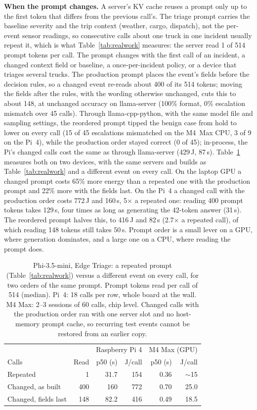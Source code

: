 \documentclass[conference]{IEEEtran}
\begin{document}
\textbf{When the prompt changes.}\label{sec:stream} A server's KV cache reuses a prompt only up to the first token that differs from the previous call's. The triage prompt carries the baseline severity and the trip context (weather, cargo, dispatch), not the per-event sensor readings, so consecutive calls about one truck in one incident usually repeat it, which is what Table~\ref{tab:realwork} measures: the server read 1 of 514 prompt tokens per call. The prompt changes with the first call of an incident, a changed context field or baseline, a once-per-incident policy, or a device that triages several trucks. The production prompt places the event's fields before the decision rules, so a changed event re-reads about 400 of its 514 tokens; moving the fields after the rules, with the wording otherwise unchanged, cuts this to about 148, at unchanged accuracy on llama-server (100\% format, 0\% escalation mismatch over 45 calls). Through llama-cpp-python, with the same model file and sampling settings, the reordered prompt tipped the benign case from hold to lower on every call (15 of 45 escalations mismatched on the M4~Max CPU, 3 of 9 on the Pi~4), while the production order stayed correct (0 of 45); in-process, the Pi's changed calls cost the same as through llama-server (429\,J, 87\,s). Table~\ref{tab:stream} measures both on two devices, with the same servers and builds as Table~\ref{tab:realwork} and a different event on every call. On the laptop GPU a changed prompt costs 65\% more energy than a repeated one with the production prompt and 22\% more with the fields last. On the Pi~4 a changed call with the production order costs 772\,J and 160\,s, 5$\times$ a repeated one: reading 400 prompt tokens takes 129\,s, four times as long as generating the 42-token answer (31\,s). The reordered prompt halves this, to 416\,J and 82\,s (2.7$\times$ a repeated call), of which reading 148 tokens still takes 50\,s. Prompt order is a small lever on a GPU, where generation dominates, and a large one on a CPU, where reading the prompt does.

\begin{table}[t]
\caption{Phi-3.5-mini, Edge Triage: a repeated prompt (Table~\ref{tab:realwork}) versus a different event on every call, for two orders of the same prompt. Prompt tokens read per call of 514 (median). Pi~4: 18 calls per row, whole board at the wall. M4 Max: 2--3 sessions of 60 calls, chip level. Changed calls with the production order ran with one server slot and no host-memory prompt cache, so recurring test events cannot be restored from an earlier copy.}
\label{tab:stream}
\centering
\small
\begin{tabular}{@{}lrrrrr@{}}
\toprule
 & & \multicolumn{2}{c}{Raspberry Pi 4} & \multicolumn{2}{c}{M4 Max (GPU)} \\
Calls & Read & p50 (s) & J/call & p50 (s) & J/call \\
\midrule
Repeated & 1 & 31.7 & 154 & 0.36 & $\sim$15 \\
Changed, as built & 400 & 160 & 772 & 0.70 & 25.0 \\
Changed, fields last & 148 & 82.2 & 416 & 0.49 & 18.5 \\
\bottomrule
\end{tabular}
\end{table}
\end{document}
